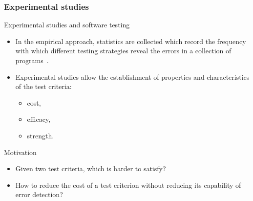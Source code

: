 \begin{frame}[parent={cmap:experimental-studies},hasnext=true,hasprev=true]
\frametitle{Experimental studies}
\label{concept:experimental-studies-for-software-testing}

\begin{block:fact}{Experimental studies and software testing}
\begin{itemize}
	\item In the empirical approach, statistics are collected which record the
	frequency with which different testing strategies reveal the errors in a
	collection of programs~\cite{howden:1978}.

	\item Experimental studies allow the establishment of properties and
	characteristics of the test criteria:
	\begin{itemize}
		\item cost,
		\item efficacy,
		\item strength.
	\end{itemize}
\end{itemize}
\end{block:fact}

\begin{block:fact}{Motivation}
\begin{itemize}
	\item Given two test criteria, which is harder to satisfy?

	\item How to reduce the cost of a test criterion without reducing its
	capability of error detection?
\end{itemize}

\hfill
{}
\end{block:fact}
\end{frame}